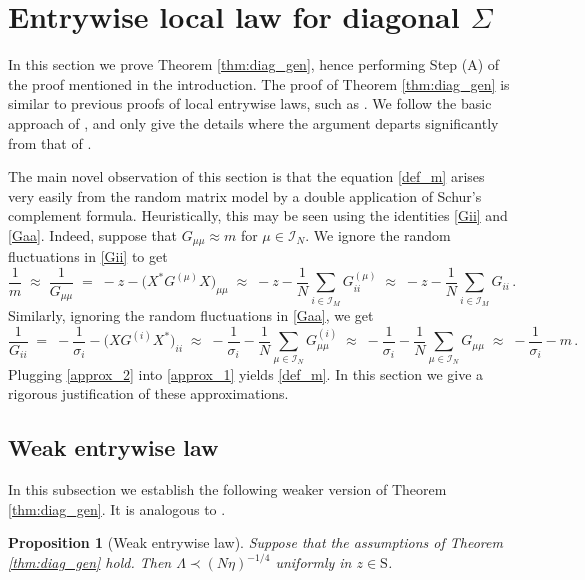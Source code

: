 \documentclass[11pt]{article} %
\numberwithin{equation}{section}
\numberwithin{figure}{section}
\theoremstyle{plain} %
\newtheorem{proposition}[theorem]{Proposition}
\theoremstyle{definition} %
\newcommand{\f}[1]{\boldsymbol{\mathrm{#1}}} %
\renewcommand{\cal}{\mathcal}
\newcommand{\pb}[1]{\bigl({#1}\bigr)}
\begin{document}
\section{Entrywise local law for diagonal $\Sigma$} \label{sec:diag_Sigma}


In this section we prove Theorem \ref{thm:diag_gen}, hence performing Step (A) of the proof mentioned in the introduction.
The proof of Theorem \ref{thm:diag_gen} is similar to previous proofs of local entrywise laws, such as \cite{PY, BEKYY}. We follow the basic approach of \cite[Section 4]{BEKYY}, and only give the details where the argument departs significantly from that of \cite{BEKYY}.


The main novel observation of this section is that the equation \eqref{def_m} arises very easily from the random matrix model by a double application of Schur's complement formula. Heuristically, this may be seen using the identities \eqref{Gii} and \eqref{Gaa}. Indeed, suppose that $G_{\mu \mu} \approx m$ for $\mu \in \cal I_N$. We ignore the random fluctuations in \eqref{Gii} to get
\begin{equation} \label{approx_1}
\frac{1}{m} \;\approx\; \frac{1}{G_{\mu \mu}} \;=\; - z - \pb{X^* G^{(\mu)} X}_{\mu\mu} \;\approx\; - z - \frac{1}{N} \sum_{i \in \cal I_M} G_{ii}^{(\mu)} \;\approx\; - z - \frac{1}{N} \sum_{i \in \cal I_M} G_{ii}\,.
\end{equation}
Similarly, ignoring the random fluctuations in \eqref{Gaa}, we get
\begin{equation} \label{approx_2}
\frac{1}{G_{ii}} \;=\; - \frac{1}{\sigma_i} - \pb{X G^{(i)} X^*}_{i i} \;\approx\; -\frac{1}{\sigma_i} - \frac{1}{N} \sum_{\mu \in \cal I_N} G^{(i)}_{\mu \mu} \;\approx\; -\frac{1}{\sigma_i} - \frac{1}{N} \sum_{\mu \in \cal I_N} G_{\mu \mu} \;\approx\; -\frac{1}{\sigma_i} - m\,.
\end{equation}
Plugging \eqref{approx_2} into \eqref{approx_1} yields \eqref{def_m}. In this section we give a rigorous justification of these approximations.


\subsection{Weak entrywise law}
In this subsection we establish the following weaker version of Theorem \ref{thm:diag_gen}.  It is analogous to \cite[Proposition 4.2]{BEKYY}.
\begin{proposition}[Weak entrywise law] \label{prop:weak law}
Suppose that the assumptions of Theorem \ref{thm:diag_gen} hold. Then $\Lambda \prec (N \eta)^{-1/4}$ uniformly in $z \in \f S$.
\end{proposition}
\end{document}
